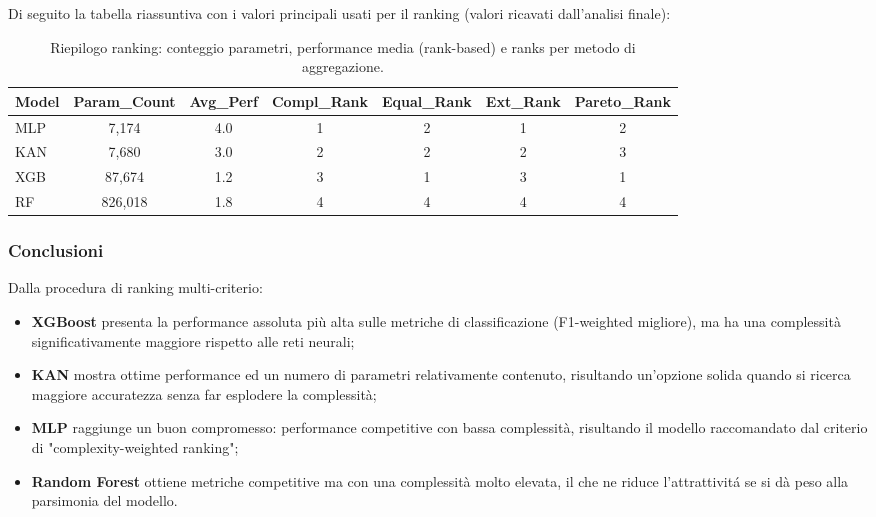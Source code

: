 \documentclass[a4paper,12pt]{report}
\begin{document}
	Di seguito la tabella riassuntiva con i valori principali usati per il ranking (valori ricavati dall'analisi finale):
	
	\begin{table}[H]
		\centering
		\setlength{\tabcolsep}{2pt}
		\begin{tabular}{lcccccc}
			\toprule
			\textbf{Model} & \textbf{Param\_Count} & \textbf{Avg\_Perf} & \textbf{Compl\_Rank} & \textbf{Equal\_Rank} & \textbf{Ext\_Rank} & \textbf{Pareto\_Rank} \\
			\midrule
			MLP           & 7,174   & 4.0 & 1 & 2 & 1 & 2 \\
			KAN           & 7,680   & 3.0 & 2 & 2 & 2 & 3 \\
			XGB           & 87,674  & 1.2 & 3 & 1 & 3 & 1 \\
			RF 			  & 826,018 & 1.8 & 4 & 4 & 4 & 4 \\
			\bottomrule
		\end{tabular}
		\caption{Riepilogo ranking: conteggio parametri, performance media (rank-based) e ranks per metodo di aggregazione.}
	\end{table}
	
	\subsubsection{Conclusioni}
	Dalla procedura di ranking multi-criterio:
	\begin{itemize}
		\item \textbf{XGBoost} presenta la performance assoluta più alta sulle metriche di classificazione (F1-weighted migliore), ma ha una complessità significativamente maggiore rispetto alle reti neurali;
		\item \textbf{KAN} mostra ottime performance ed un numero di parametri relativamente contenuto, risultando un'opzione solida quando si ricerca maggiore accuratezza senza far esplodere la complessità;
		\item \textbf{MLP} raggiunge un buon compromesso: performance competitive con bassa complessità, risultando il modello raccomandato dal criterio di "complexity-weighted ranking";
		\item \textbf{Random Forest} ottiene metriche competitive ma con una complessità molto elevata, il che ne riduce l'attrattivitá se si dà peso alla parsimonia del modello.
	\end{itemize}
	
\end{document}
